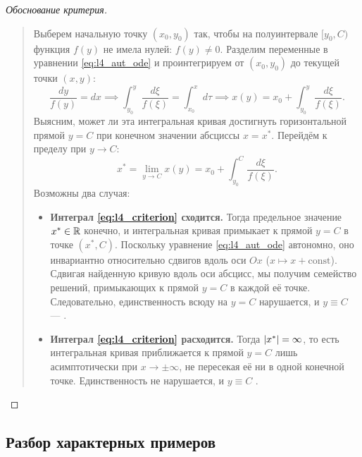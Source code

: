 \begin{proof}[Обоснование критерия]~\\
    \begin{quote}
        Выберем начальную точку $(x_0, y_0)$ так, чтобы на полуинтервале
        $[y_0, C)$ функция $f(y)$ не имела нулей: $f(y) \neq 0$. Разделим
        переменные в уравнении \eqref{eq:l4_aut_ode} и проинтегрируем от
        $(x_0, y_0)$ до текущей точки $(x, y)$:
        \[
            \frac{dy}{f(y)} = dx \implies
            \int_{y_0}^{y} \frac{d\xi}{f(\xi)} = \int_{x_0}^{x} d\tau \implies
            x(y) = x_0 + \int_{y_0}^{y} \frac{d\xi}{f(\xi)}.
        \]
        Выясним, может ли эта интегральная кривая достигнуть горизонтальной
        прямой $y = C$ при конечном значении абсциссы $x = x^*$. Перейдём к
        пределу при $y \to C$:
        \[
            x^* = \lim_{y \to C} x(y) = x_0 + \int_{y_0}^{C} \frac{d\xi}{f(\xi)}.
        \]
        Возможны два случая:
        \begin{itemize}
            \item \textbf{Интеграл \eqref{eq:l4_criterion} сходится.} Тогда
            предельное значение $x^* \in \mathbb{R}$ конечно, и интегральная кривая
            примыкает к прямой $y = C$ в точке $(x^*, C)$. Поскольку уравнение
            \eqref{eq:l4_aut_ode} автономно, оно инвариантно относительно
            сдвигов вдоль оси $Ox$ ($x \mapsto x + \text{const}$). Сдвигая
            найденную кривую вдоль оси абсцисс, мы получим семейство решений,
            примыкающих к прямой $y = C$ в каждой её точке. Следовательно,
            единственность всюду на $y = C$ нарушается, и $y \equiv C$ —
            .
            \item \textbf{Интеграл \eqref{eq:l4_criterion} расходится.} Тогда
            $\left| x^* \right| = \infty$, то есть интегральная кривая приближается к
            прямой $y = C$ лишь асимптотически при $x \to \pm\infty$, не
            пересекая её ни в одной конечной точке. Единственность не
            нарушается, и $y \equiv C$ .
        \end{itemize}
    \end{quote}
\end{proof}

\subsection{Разбор характерных примеров}

